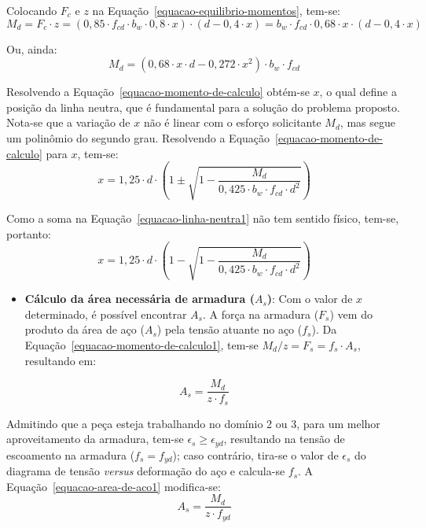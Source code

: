 Colocando $F_c$ e $z$ na Equação~\eqref{equacao-equilibrio-momentos}, tem-se:
\begin{equation}
	M_d=F_c\cdot z=(0,85\cdot f_{cd}\cdot b_w\cdot0,8\cdot x)\cdot(d-0,4\cdot x)=b_w\cdot f_{cd}\cdot0,68\cdot x\cdot(d-0,4\cdot x)
\end{equation}

Ou, ainda:
\begin{equation}
	\label{equacao-momento-de-calculo}
	M_d=(0,68\cdot x\cdot d-0,272\cdot x^2)\cdot b_w\cdot f_{cd}
\end{equation}

Resolvendo a Equação~\eqref{equacao-momento-de-calculo} obtém-se $x$, o qual define a posição da linha neutra, que é fundamental para a solução do problema proposto. Nota-se que a variação de $x$ não é linear com o esforço solicitante $M_d$, mas segue um polinômio do segundo grau. Resolvendo a Equação~\eqref{equacao-momento-de-calculo} para $x$, tem-se:
\begin{equation}
	\label{equacao-linha-neutra1}
	x=1,25\cdot d\cdot\left(1\pm\sqrt{1-\frac{M_d}{0,425\cdot b_w\cdot f_{cd}\cdot d^2}}\right)
\end{equation}

Como a soma na Equação~\eqref{equacao-linha-neutra1} não tem sentido físico, tem-se, portanto:
\begin{equation}
	\label{equacao-linha-neutra}
	x=1,25\cdot d\cdot\left(1-\sqrt{1-\frac{M_d}{0,425\cdot b_w\cdot f_{cd}\cdot d^2}}\right)
\end{equation}

\begin{itemize}
	\item \textbf{Cálculo da área necessária de armadura ($A_s$)}: Com o valor de $x$ determinado, é possível encontrar $A_s$. A força na armadura ($F_s$) vem do produto da área de aço ($A_s$) pela tensão atuante no aço ($f_s$). Da Equação~\eqref{equacao-momento-de-calculo1}, tem-se $M_d/z=F_s=f_s\cdot A_s$, resultando em:
\end{itemize}
\begin{equation}
	\label{equacao-area-de-aco1}
	A_s=\frac{M_d}{z\cdot f_s}
\end{equation}

Admitindo que a peça esteja trabalhando no domínio 2 ou 3, para um melhor aproveitamento da armadura, tem-se $\epsilon_s\geqslant\epsilon_{yd}$, resultando na tensão de escoamento na armadura ($f_s=f_{yd}$); caso contrário, tira-se o valor de $\epsilon_s$ do diagrama de tensão \textit{versus} deformação do aço e calcula-se $f_s$. A Equação~\eqref{equacao-area-de-aco1} modifica-se:
\begin{equation}
	A_s=\frac{M_d}{z\cdot f_{yd}}
\end{equation}